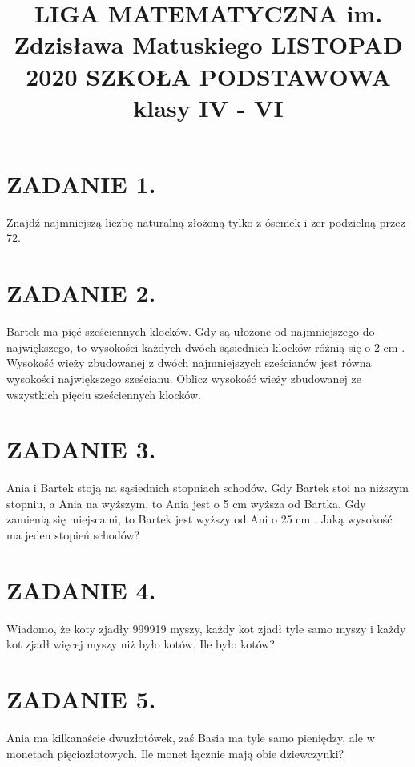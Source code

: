 \documentclass[10pt]{article}
\title{LIGA MATEMATYCZNA im. Zdzisława Matuskiego LISTOPAD 2020 SZKOŁA PODSTAWOWA klasy IV - VI }
\author{}
\date{}
\begin{document}
\maketitle
\section*{ZADANIE 1.}
Znajdź najmniejszą liczbę naturalną złożoną tylko z ósemek i zer podzielną przez 72.

\section*{ZADANIE 2.}
Bartek ma pięć sześciennych klocków. Gdy są ułożone od najmniejszego do największego, to wysokości każdych dwóch sąsiednich klocków różnią się o 2 cm . Wysokość wieży zbudowanej z dwóch najmniejszych sześcianów jest równa wysokości największego sześcianu. Oblicz wysokość wieży zbudowanej ze wszystkich pięciu sześciennych klocków.

\section*{ZADANIE 3.}
Ania i Bartek stoją na sąsiednich stopniach schodów. Gdy Bartek stoi na niższym stopniu, a Ania na wyższym, to Ania jest o 5 cm wyższa od Bartka. Gdy zamienią się miejscami, to Bartek jest wyższy od Ani o 25 cm . Jaką wysokość ma jeden stopień schodów?

\section*{ZADANIE 4.}
Wiadomo, że koty zjadły 999919 myszy, każdy kot zjadł tyle samo myszy i każdy kot zjadł więcej myszy niż było kotów. Ile było kotów?

\section*{ZADANIE 5.}
Ania ma kilkanaście dwuzłotówek, zaś Basia ma tyle samo pieniędzy, ale w monetach pięciozłotowych. Ile monet łącznie mają obie dziewczynki?
\end{document}

